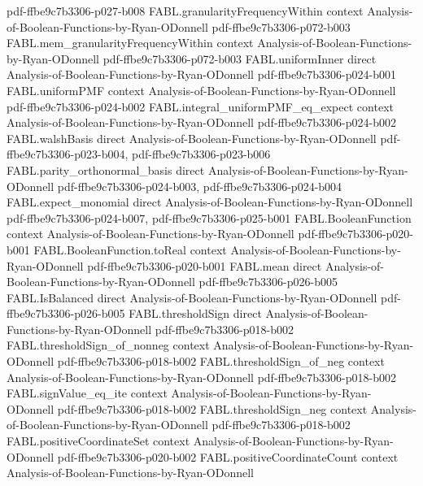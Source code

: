 \begin{theorem}
  {pdf-ffbe9c7b3306-p027-b008}
\proofstep
  {FABL.granularityFrequencyWithin}
  {context}
  {Analysis-of-Boolean-Functions-by-Ryan-ODonnell}
  {pdf-ffbe9c7b3306-p072-b003}
\proofstep
  {FABL.mem_granularityFrequencyWithin}
  {context}
  {Analysis-of-Boolean-Functions-by-Ryan-ODonnell}
  {pdf-ffbe9c7b3306-p072-b003}
\proofstep
  {FABL.uniformInner}
  {direct}
  {Analysis-of-Boolean-Functions-by-Ryan-ODonnell}
  {pdf-ffbe9c7b3306-p024-b001}
\proofstep
  {FABL.uniformPMF}
  {context}
  {Analysis-of-Boolean-Functions-by-Ryan-ODonnell}
  {pdf-ffbe9c7b3306-p024-b002}
\proofstep
  {FABL.integral_uniformPMF_eq_expect}
  {context}
  {Analysis-of-Boolean-Functions-by-Ryan-ODonnell}
  {pdf-ffbe9c7b3306-p024-b002}
\proofstep
  {FABL.walshBasis}
  {direct}
  {Analysis-of-Boolean-Functions-by-Ryan-ODonnell}
  {pdf-ffbe9c7b3306-p023-b004,
    pdf-ffbe9c7b3306-p023-b006}
\proofstep
  {FABL.parity_orthonormal_basis}
  {direct}
  {Analysis-of-Boolean-Functions-by-Ryan-ODonnell}
  {pdf-ffbe9c7b3306-p024-b003,
    pdf-ffbe9c7b3306-p024-b004}
\proofstep
  {FABL.expect_monomial}
  {direct}
  {Analysis-of-Boolean-Functions-by-Ryan-ODonnell}
  {pdf-ffbe9c7b3306-p024-b007,
    pdf-ffbe9c7b3306-p025-b001}
\proofstep
  {FABL.BooleanFunction}
  {context}
  {Analysis-of-Boolean-Functions-by-Ryan-ODonnell}
  {pdf-ffbe9c7b3306-p020-b001}
\proofstep
  {FABL.BooleanFunction.toReal}
  {context}
  {Analysis-of-Boolean-Functions-by-Ryan-ODonnell}
  {pdf-ffbe9c7b3306-p020-b001}
\proofstep
  {FABL.mean}
  {direct}
  {Analysis-of-Boolean-Functions-by-Ryan-ODonnell}
  {pdf-ffbe9c7b3306-p026-b005}
\proofstep
  {FABL.IsBalanced}
  {direct}
  {Analysis-of-Boolean-Functions-by-Ryan-ODonnell}
  {pdf-ffbe9c7b3306-p026-b005}
\proofstep
  {FABL.thresholdSign}
  {direct}
  {Analysis-of-Boolean-Functions-by-Ryan-ODonnell}
  {pdf-ffbe9c7b3306-p018-b002}
\proofstep
  {FABL.thresholdSign_of_nonneg}
  {context}
  {Analysis-of-Boolean-Functions-by-Ryan-ODonnell}
  {pdf-ffbe9c7b3306-p018-b002}
\proofstep
  {FABL.thresholdSign_of_neg}
  {context}
  {Analysis-of-Boolean-Functions-by-Ryan-ODonnell}
  {pdf-ffbe9c7b3306-p018-b002}
\proofstep
  {FABL.signValue_eq_ite}
  {context}
  {Analysis-of-Boolean-Functions-by-Ryan-ODonnell}
  {pdf-ffbe9c7b3306-p018-b002}
\proofstep
  {FABL.thresholdSign_neg}
  {context}
  {Analysis-of-Boolean-Functions-by-Ryan-ODonnell}
  {pdf-ffbe9c7b3306-p018-b002}
\proofstep
  {FABL.positiveCoordinateSet}
  {context}
  {Analysis-of-Boolean-Functions-by-Ryan-ODonnell}
  {pdf-ffbe9c7b3306-p020-b002}
\proofstep
  {FABL.positiveCoordinateCount}
  {context}
  {Analysis-of-Boolean-Functions-by-Ryan-ODonnell}

\end{theorem}
